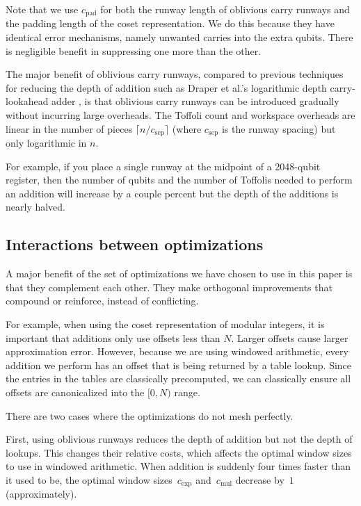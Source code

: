 \documentclass[a4paper, onecolumn, accepted=2021-03-29]{quantumarticle}
\newcommand{\gexp}{{c_{\text{exp}}}}
\newcommand{\gmul}{{c_{\text{mul}}}}
\newcommand{\gsep}{{c_{\text{sep}}}}
\newcommand{\gpad}{{c_{\text{pad}}}}
\begin{document}
Note that we use $\gpad$ for both the runway length of oblivious carry runways and the padding length of the coset representation.
We do this because they have identical error mechanisms, namely unwanted carries into the extra qubits.
There is negligible benefit in suppressing one more than the other.

The major benefit of oblivious carry runways, compared to previous techniques for reducing the depth of addition such as Draper et al.'s logarithmic depth carry-lookahead adder \cite{draper2004logarithmic}, is that oblivious carry runways can be introduced gradually without incurring large overheads.
The Toffoli count and workspace overheads are linear in the number of pieces $\lceil n/\gsep\rceil$ (where $\gsep$ is the runway spacing) but only logarithmic in $n$.

For example, if you place a single runway at the midpoint of a 2048-qubit register, then the number of qubits and the number of Toffolis needed to perform an addition will increase by a couple percent but the depth of the additions is nearly halved.

\subsection{Interactions between optimizations}

A major benefit of the set of optimizations we have chosen to use in this paper is that they complement each other.
They make orthogonal improvements that compound or reinforce, instead of conflicting.

For example, when using the coset representation of modular integers, it is important that additions only use offsets less than $N$.
Larger offsets cause larger approximation error.
However, because we are using windowed arithmetic, every addition we perform has an offset that is being returned by a table lookup.
Since the entries in the tables are classically precomputed, we can classically ensure all offsets are canonicalized into the $[0, N)$ range.

There are two cases where the optimizations do not mesh perfectly.

First, using oblivious runways reduces the depth of addition but not the depth of lookups.
This changes their relative costs, which affects the optimal window sizes to use in windowed arithmetic.
When addition is suddenly four times faster than it used to be, the optimal window sizes~$\gexp$ and~$\gmul$ decrease by~$1$ (approximately).
\end{document}
